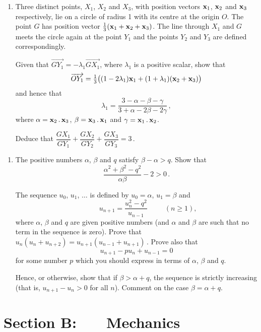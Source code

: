 \documentclass[a4, 11pt]{report}
\newlength{\qspace}
\newcounter{qnumber}
\newenvironment{question}%
 {\vspace{\qspace}
  \begin{enumerate}[\bfseries 1\quad][10]%
    \setcounter{enumi}{\value{qnumber}}%
    \item%
 }
{
  \end{enumerate}
  \filbreak
  \stepcounter{qnumber}
 }
\def\ge{\geqslant}
\begin{document}
\begin{question}
Three distinct points, $X_1$, $X_2$ and $X_3$,
with position vectors ${\bf x}_1$, ${\bf x}_2$ and ${\bf x}_3$ 
respectively, lie on a   circle of radius 1 with 
its centre at the origin $O$.
The point  $G$ 
has position vector $\frac13({\bf x}_1+{\bf x}_2+{\bf x}_3)$.
        The line through $X_1$ and $G$ meets the circle again at 
the point $Y_1$ and the points
$Y_2$ and $Y_3$ are defined correspondingly.

Given that $\overrightarrow{GY_1} =-\lambda_1 \overrightarrow{GX_1}$,
where $\lambda_1$  is a positive scalar, show that
\[
\overrightarrow{OY_1}= \tfrac13 \big(
(1-2\lambda_1){\bf x}_1 +(1+\lambda_1)({\bf x}_2+{\bf x}_3)\big)
\]
and hence that
\[
\lambda_1 = \frac
{3-\alpha-\beta-\gamma} {3+\alpha -2\beta-2\gamma}
\,,\]
where $\alpha = {\bf x}_2 \,.\, {\bf x}_3$,
$\beta = {\bf x}_3\,.\, {\bf x}_1$ and
$\gamma = {\bf x}_1\,.\, {\bf x}_2$.

Deduce that $\dfrac {GX_1}{GY_1} + \dfrac {GX_2}{GY_2} +
\dfrac {GX_3}{GY_3} =3
\,$.
\end{question}
		
\begin{question}
The positive numbers $\alpha$, $\beta$ and $q$ satisfy
$\beta-\alpha >q$. Show that
\[
\frac{\alpha^2+\beta^2 -q^2}{\alpha\beta}-2>0\,.
\]

The sequence $u_0$, $u_1$, $\ldots$ is defined by $u_0=\alpha$,
$u_1=\beta$ and 
\[
\ \ \ \ \ \ \ \ \ \ \ \ \ \ \ 
u_{n+1} = \frac {u_{n}^2 -q^2}{u_{n-1}}
\ \ \ \ \ \ \ \ \ \ \ (n\ge1),
\]
where $\alpha$, $\beta$ and $q$ are given positive numbers (and $\alpha$ and $\beta$
are such that
no term in the sequence is zero). 
Prove that $u_n(u_n+u_{n+2}) = u_{n+1}(u_{n-1}+u_{n+1})\,$.
Prove also that                  
\[
u_{n+1} -pu_n + u_{n-1}=0
\]
for some number $p$ which you should express in terms of $\alpha$, $\beta$ and $q$. 

Hence, or otherwise, show that if $\beta> \alpha+q$, the sequence is strictly increasing
(that is, $u_{n+1}-u_n > 0$ for all $n$). 
Comment on the case $\beta =\alpha +q$.
\end{question}	
		

		
	
\newpage
\section*{Section B: \ \ \ Mechanics}
\end{document}

